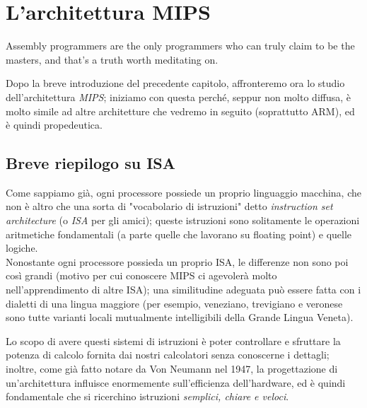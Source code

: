 



\chapter{L'architettura MIPS}\begin{fquote}Assembly programmers are the only programmers who can truly claim to be the masters, and that's a truth worth meditating on.
 \end{fquote}

Dopo la breve introduzione del precedente capitolo, affronteremo ora lo studio dell'architettura \emph{MIPS}; iniziamo con questa perché, seppur non molto diffusa, è molto simile ad altre architetture che vedremo in seguito (soprattutto ARM), ed è quindi propedeutica.

\section{Breve riepilogo su ISA}
Come sappiamo già, ogni processore possiede un proprio linguaggio macchina, che non è altro che una sorta di "vocabolario di istruzioni" detto \emph{instruction set architecture} (o \emph{ISA} per gli amici); queste istruzioni sono solitamente le operazioni aritmetiche fondamentali (a parte quelle che lavorano su floating point) e quelle logiche.\\
Nonostante ogni processore possieda un proprio ISA, le differenze non sono poi così grandi (motivo per cui conoscere MIPS ci agevolerà molto nell'apprendimento di altre ISA); una similitudine adeguata può essere fatta con i dialetti di una lingua maggiore (per esempio, veneziano, trevigiano e veronese sono tutte varianti locali mutualmente intelligibili della Grande Lingua Veneta).

Lo scopo di avere questi sistemi di istruzioni è poter controllare e sfruttare la potenza di calcolo fornita dai nostri calcolatori senza conoscerne i dettagli; inoltre, come già fatto notare da Von Neumann nel 1947, la progettazione di un'architettura influisce enormemente sull'efficienza dell'hardware, ed è quindi fondamentale che si ricerchino istruzioni \emph{semplici, chiare e veloci}.

